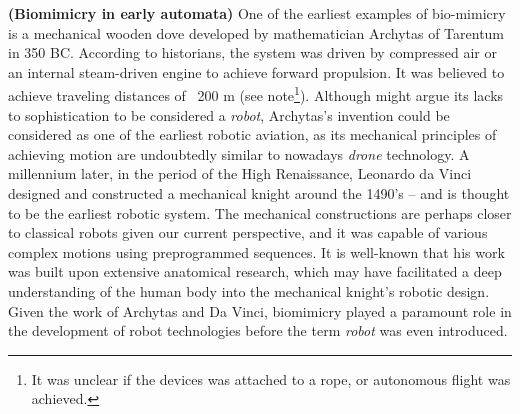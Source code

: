 \textbf{(Biomimicry in early automata)} One of the earliest examples of bio-mimicry is a mechanical wooden dove developed by mathematician Archytas of Tarentum in 350 BC. According to historians, the system was driven by compressed air or an internal steam-driven engine to achieve forward propulsion. It was believed to achieve traveling distances of ~200 \si{\meter} (see note\footnote{It was unclear if the devices was attached to a rope, or autonomous flight was achieved.}). Although might argue its lacks to sophistication to be considered a \emph{robot}, Archytas's invention could be considered as one of the earliest robotic aviation, as its mechanical principles of achieving motion are undoubtedly similar to nowadays \emph{drone} technology. A millennium later, in the period of the High Renaissance, Leonardo da Vinci designed and constructed a mechanical knight around the 1490's -- and is thought to be the earliest robotic system. The mechanical constructions are perhaps closer to classical robots given our current perspective, and it was capable of various complex motions using preprogrammed sequences. It is well-known that his work was built upon extensive anatomical research, which may have facilitated a deep understanding of the human body into the mechanical knight's robotic design. Given the work of Archytas and Da Vinci, biomimicry played a paramount role in the development of robot technologies before the term \emph{robot} was even introduced.


